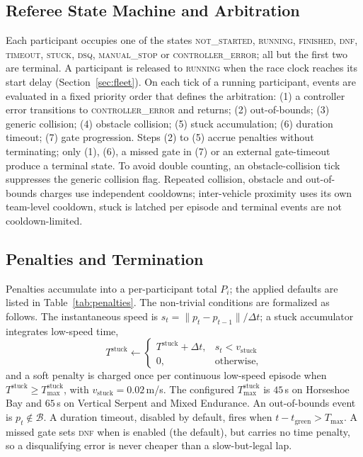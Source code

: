 


\subsection{Referee State Machine and Arbitration}

Each participant occupies one of the states \textsc{not\_started}, \textsc{running}, \textsc{finished}, \textsc{dnf}, \textsc{timeout}, \textsc{stuck}, \textsc{dsq}, \textsc{manual\_stop} or \textsc{controller\_error}; all but the first two are terminal. A participant is released to \textsc{running} when the race clock reaches its start delay (Section~\ref{sec:fleet}). On each tick of a running participant, events are evaluated in a fixed priority order that defines the arbitration: (1) a controller error transitions to \textsc{controller\_error} and returns; (2) out-of-bounds; (3) generic collision; (4) obstacle collision; (5) stuck accumulation; (6) duration timeout; (7) gate progression. Steps (2) to (5) accrue penalties without terminating; only (1), (6), a missed gate in (7) or an external gate-timeout produce a terminal state. To avoid double counting, an obstacle-collision tick suppresses the generic collision flag. Repeated collision, obstacle and out-of-bounds charges use independent cooldowns; inter-vehicle proximity uses its own team-level cooldown, stuck is latched per episode and terminal events are not cooldown-limited.

\subsection{Penalties and Termination}



Penalties accumulate into a per-participant total $P_i$; the applied defaults are listed in Table~\ref{tab:penalties}. The non-trivial conditions are formalized as follows. The instantaneous speed is $s_t=\lVert p_t-p_{t-1}\rVert/\Delta t$; a stuck accumulator integrates low-speed time,
\begin{equation}
\label{eq:stuck}
T^{\mathrm{stuck}}\!\leftarrow\!\begin{cases} T^{\mathrm{stuck}}+\Delta t, & s_t<v_{\mathrm{stuck}}\\ 0, & \text{otherwise,}\end{cases}
\end{equation}
and a soft penalty is charged once per continuous low-speed episode when $T^{\mathrm{stuck}}\ge T^{\mathrm{stuck}}_{\max}$, with $v_{\mathrm{stuck}}=0.02$\,m/s. The configured $T^{\mathrm{stuck}}_{\max}$ is $45$\,s on Horseshoe Bay and $65$\,s on Vertical Serpent and Mixed Endurance. An out-of-bounds event is $p_t\notin\mathcal{B}$. A duration timeout, disabled by default, fires when $t-t_{\mathrm{green}}>T_{\max}$. A missed gate sets \textsc{dnf} when  is enabled (the default), but carries no time penalty, so a disqualifying error is never cheaper than a slow-but-legal lap.

